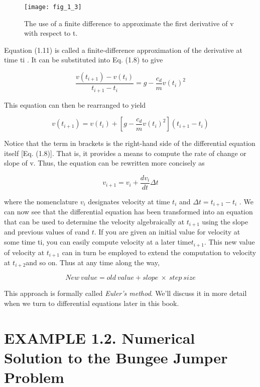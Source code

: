 \documentclass[../main.tex]{subfiles}
\begin{document}
\begin{figure}[H]
	\centering
	\texttt{[image: fig\_1\_3]}
   \caption{\textsf{The use of a finite difference to approximate the first derivative of v with respect to t.}}
	\label{fig:fig_1_3}
\end{figure}

Equation (1.11) is called a finite-difference approximation of the derivative at time ti .
It can be substituted into Eq. (1.8) to give

$$\dfrac{v(t_{i+1})-v(t_i)}{t_{i+1}-t_i}= g- \dfrac{c_d}{m}v(t_i)^2$$

This equation can then be rearranged to yield

\begin{equation}
	\tag{1.12}
	v(t_{i+1})= v(t_i)+ \left[ g- \dfrac{c_d}{m}v(t_i)^2 \right](t_{i+1}-t_i)
\end{equation}

Notice that the term in brackets is the right-hand side of the differential equation itself
[Eq. (1.8)]. That is, it provides a means to compute the rate of change or slope of v. Thus,
the equation can be rewritten more concisely as

\begin{equation}
	\tag{1.13}
	v_{i+1}=v_i + \dfrac{dv_i}{dt}\Delta t
\end{equation}

where the nomenclature $v_i$ designates velocity at time $t_i$ and $\Delta t = t_{i+1} - t_i$ .
We can now see that the differential equation has been transformed into an equation that
can be used to determine the velocity algebraically at $t_{i+1}$ using the slope and previous values
 of $v $and $t$. If you are given an initial value for velocity at some time ti, you can easily compute
  velocity at a later time$ t_{i+1}$. This new value of velocity at $ t_{i+1}$ can in turn be employed to
extend the computation to velocity at $t_{i+2} $and so on. Thus at any time along the way,

$$ New \ value = old \ value + slope \ \times  \ step \ size $$

This approach is formally called \textsl{Euler's method}. We'll discuss it in more detail when we
turn to differential equations later in this book.


\section*{EXAMPLE 1.2. Numerical Solution to the Bungee Jumper Problem}
\end{document}
